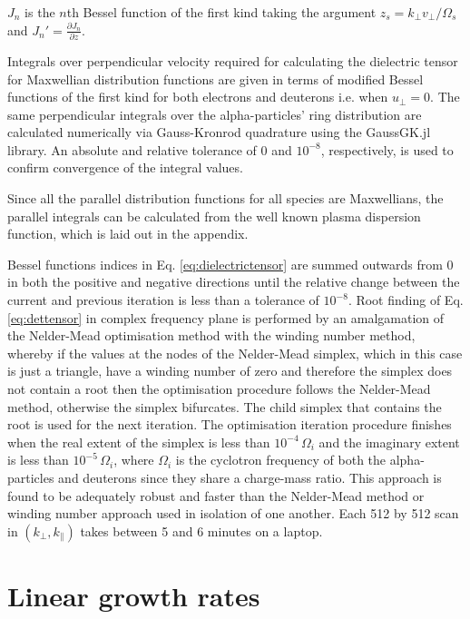 \documentclass[12pt]{iopart}
\begin{document}
\noindent $J_n$ is the $n$th Bessel function of the first kind taking the
argument $z_s=k_\perp v_\perp / \Omega_s$ and $J_n'=\frac{\partial J_n}{\partial z}$.

Integrals over perpendicular velocity required for calculating the
dielectric tensor for Maxwellian distribution functions are given in terms of
modified Bessel functions of the first kind\cite{Stix} for both electrons and
deuterons i.e. when $u_\perp =0$. The same perpendicular integrals over the
alpha-particles' ring distribution are calculated numerically via
Gauss-Kronrod\cite{Kronrod1965} quadrature using the GaussGK.jl\cite{QuadGK}
library. An absolute and relative tolerance of $0$ and $10^{-8}$, respectively,
is used to confirm convergence of the integral values.

Since all the parallel distribution functions for all species are Maxwellians,
the parallel integrals can be calculated from the well known plasma dispersion
function\cite{Fried1961}, which is laid out in the appendix.

Bessel functions indices in Eq. \ref{eq:dielectrictensor} are summed outwards
from 0 in both the positive and negative directions
until the relative change between the current and
previous iteration is less than a tolerance of $10^{-8}$. Root finding of Eq.
\ref{eq:dettensor} in complex frequency plane is performed by an amalgamation of the
Nelder-Mead\cite{Nelder1965} optimisation method with the winding number method,
whereby if the values at the nodes of the Nelder-Mead simplex, which in this
case is just a triangle, have a winding number
of zero and therefore the simplex does not contain a root then the optimisation
procedure follows the Nelder-Mead method, otherwise the simplex bifurcates.
The child simplex that contains the root is used for the next
iteration. The optimisation iteration procedure finishes when the real extent of
the simplex is less than $10^{-4}\, \Omega_i$ and the imaginary extent is less
than $10^{-5}\,\Omega_i$, where $\Omega_i$ is the cyclotron frequency of both
the alpha-particles and deuterons since they share a charge-mass ratio.
This approach is found to be adequately robust and
faster than the Nelder-Mead method or winding number approach used in isolation
of one another. Each 512 by 512 scan in $(k_\perp, k_\parallel)$ takes between 5
and 6 minutes on a laptop.

\section{Linear growth rates}
\end{document}
